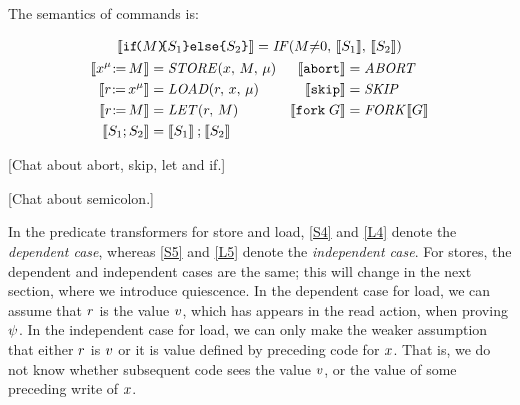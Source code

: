\begin{definition}
  \noindent
  The semantics of commands is:
  \begin{scope}
    \allowdisplaybreaks
    \begin{gather*}
      \sem{\IF{\aExp}\THEN\aCmd_1\ELSE\aCmd_2\FI} = \sIF{\aExp{\neq}0}\sTHEN\sem{\aCmd_1}\sELSE\sem{\aCmd_2}\sFI
      \\
      \begin{aligned}
        \sem{\PW[\amode]{\aLoc}{\aExp}} &= \sSTORE[\amode]{\aLoc}{\aExp}
        &
        \makebox[0em][r]{$\sem{\ABORT}$} &= \sABORT 
        \\
        \sem{\PR[\amode]{\aLoc}{\aReg}} &= \sLOAD[\amode]{\aReg}{\aLoc}
        &
        \sem{\SKIP} &= \sSKIP 
        \\
        \sem{\LET{\aReg}{\aExp}} &= \sLET{\aReg}{\aExp}
        &
        \sem{\FORK{\aGrp}} &= \sFORK{}\sem{\aGrp}      
        \\
        \sem{\aCmd_1 \SEMI \aCmd_2} &= \sem{\aCmd_1}\sSEMI\sem{\aCmd_2}
      \end{aligned}
    \end{gather*}
  \end{scope}
\end{definition}

[Chat about abort, skip, let and if.]

[Chat about semicolon.]

In the predicate transformers for store and load, \ref{S4} and \ref{L4}
denote the \emph{dependent case}, whereas \ref{S5} and \ref{L5}
denote the \emph{independent case}.  For stores, the dependent and
independent cases are the same; this will change in the next section, where
we introduce quiescence.  In the dependent case for load, we can assume that
$r$ is the value $v$, which has appears in the read action, when
proving $\psi$.  In the independent case for load, we can only make the
weaker assumption that either $r$ is $v$ or it is value defined by
preceding code for $x$.  That is, we do not know whether subsequent code
sees the value $v$, or the value of some preceding write of $x$.







